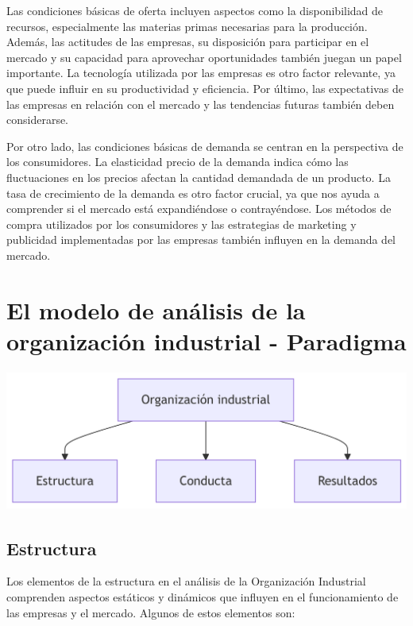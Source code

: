 \documentclass[
  doc,
  floatsintext,
  longtable,
  a4paper,
  nolmodern,
  notxfonts,
  notimes,
  colorlinks=true,linkcolor=blue,citecolor=blue,urlcolor=blue]{apa7}
\begin{document}
Las condiciones básicas de oferta incluyen aspectos como la
disponibilidad de recursos, especialmente las materias primas necesarias
para la producción. Además, las actitudes de las empresas, su
disposición para participar en el mercado y su capacidad para aprovechar
oportunidades también juegan un papel importante. La tecnología
utilizada por las empresas es otro factor relevante, ya que puede
influir en su productividad y eficiencia. Por último, las expectativas
de las empresas en relación con el mercado y las tendencias futuras
también deben considerarse.

Por otro lado, las condiciones básicas de demanda se centran en la
perspectiva de los consumidores. La elasticidad precio de la demanda
indica cómo las fluctuaciones en los precios afectan la cantidad
demandada de un producto. La tasa de crecimiento de la demanda es otro
factor crucial, ya que nos ayuda a comprender si el mercado está
expandiéndose o contrayéndose. Los métodos de compra utilizados por los
consumidores y las estrategias de marketing y publicidad implementadas
por las empresas también influyen en la demanda del mercado.

\section{El modelo de análisis de la organización industrial -
Paradigma}\label{el-modelo-de-anuxe1lisis-de-la-organizaciuxf3n-industrial---paradigma}

\includegraphics[width=5.35in,height=1.81in]{index_files/figure-latex/mermaid-figure-1.png}

\subsection{Estructura}\label{estructura}

Los elementos de la estructura en el análisis de la Organización
Industrial comprenden aspectos estáticos y dinámicos que influyen en el
funcionamiento de las empresas y el mercado. Algunos de estos elementos
son:
\end{document}
